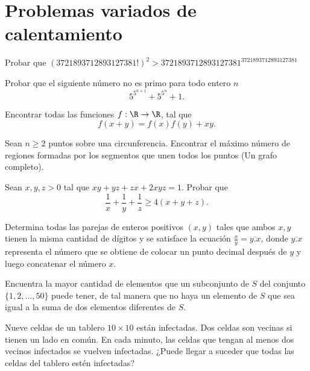 \section{\large Problemas variados de calentamiento}

\begin{problem}
    Probar que $(3721893712893127381!)^2 > 3721893712893127381^{3721893712893127381}$
\end{problem}

\begin{problem}
    Probar que el siguiente número no es primo para todo entero $n$ $$5^{5^{n+1}} + 5^{5^n} + 1.$$
\end{problem}

\begin{problem}
    Encontrar todas las funciones $f:\R \rightarrow \R$, tal que $$f(x+y)=f(x)f(y)+xy.$$
\end{problem}

\begin{problem}
    Sean $n\geq2$ puntos sobre una circunferencia. Encontrar el máximo número de regiones
    formadas por los segmentos que unen todos los puntos (Un grafo completo).
\end{problem}

\begin{problem}
    Sean $x,y,z > 0$ tal que $xy+yz+zx+2xyz=1$. Probar que $$\frac{1}{x} + \frac{1}{y} + \frac{1}{z} \geq 4(x+y+z).$$
\end{problem}

\begin{problem}
    Determina todas las parejas de enteros positivos $(x,y)$ tales que ambos $x, y$ tienen la misma cantidad de dígitos y se satisface la ecuación $\frac{x}{y} = \overline{y.x}$, donde $\overline{y.x}$ representa el número que se obtiene de colocar un punto decimal después de $y$ y luego concatenar el número $x$.
\end{problem}

\begin{problem}
    Encuentra la mayor cantidad de elementos que un subconjunto de $S$ del conjunto $\{1, 2, \dots, 50\}$ puede tener, de tal manera que no haya un elemento de $S$ que sea igual a la suma de dos elementos diferentes de $S$.
\end{problem}

\begin{problem}
    Nueve celdas de un tablero $10\times10$ están infectadas. Dos celdas son vecinas si tienen un lado en común. En cada minuto, las celdas que tengan al menos dos vecinos infectados se vuelven infectadas. ¿Puede llegar a suceder que todas las celdas del tablero estén infectadas?
\end{problem}

